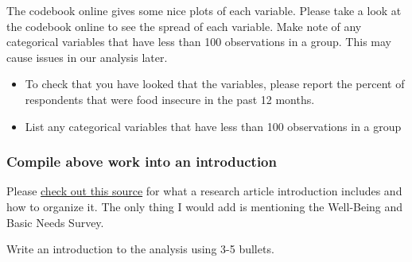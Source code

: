 \documentclass[
  letterpaper,
  DIV=11,
  numbers=noendperiod]{scrartcl}
\providecommand{\tightlist}{%
  \setlength{\itemsep}{0pt}\setlength{\parskip}{0pt}}
\begin{document}
The codebook online gives some nice plots of each variable. Please take
a look at the codebook online to see the spread of each variable. Make
note of any categorical variables that have less than 100 observations
in a group. This may cause issues in our analysis later.

\begin{tcolorbox}[enhanced jigsaw, toptitle=1mm, toprule=.15mm, leftrule=.75mm, bottomtitle=1mm, breakable, opacityback=0, titlerule=0mm, title=\textcolor{quarto-callout-important-color}{\faExclamation}\hspace{0.5em}{Task}, arc=.35mm, colback=white, rightrule=.15mm, left=2mm, colbacktitle=quarto-callout-important-color!10!white, coltitle=black, opacitybacktitle=0.6, colframe=quarto-callout-important-color-frame, bottomrule=.15mm]

\begin{itemize}
\tightlist
\item
  To check that you have looked that the variables, please report the
  percent of respondents that were food insecure in the past 12 months.
\item
  List any categorical variables that have less than 100 observations in
  a group
\end{itemize}

\end{tcolorbox}

\subsubsection{Compile above work into an
introduction}\label{compile-above-work-into-an-introduction}

Please
\href{https://www.scribbr.com/research-paper/research-paper-introduction/}{check
out this source} for what a research article introduction includes and
how to organize it. The only thing I would add is mentioning the
Well-Being and Basic Needs Survey.

\begin{tcolorbox}[enhanced jigsaw, toptitle=1mm, toprule=.15mm, leftrule=.75mm, bottomtitle=1mm, breakable, opacityback=0, titlerule=0mm, title=\textcolor{quarto-callout-important-color}{\faExclamation}\hspace{0.5em}{Task}, arc=.35mm, colback=white, rightrule=.15mm, left=2mm, colbacktitle=quarto-callout-important-color!10!white, coltitle=black, opacitybacktitle=0.6, colframe=quarto-callout-important-color-frame, bottomrule=.15mm]

Write an introduction to the analysis using 3-5 bullets.

\end{tcolorbox}
\end{document}
